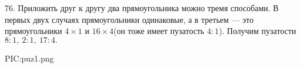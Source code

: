 76. Приложить друг к другу два прямоугольника можно тремя способами. В первых двух случаях прямоугольники одинаковые, а в третьем --- это прямоугольники $4\times1$ и $16\times4$(он тоже имеет пузатость $4:1$). Получим пузатости $8:1,\ 2:1,\ 17:4.$
\begin{center}
{{PIC:puz1.png}}
\end{center}
